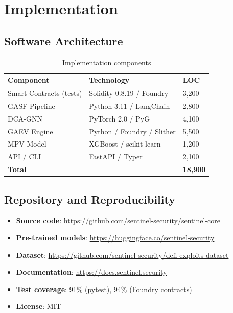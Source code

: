 \documentclass[11pt]{article}
\theoremstyle{definition}
\theoremstyle{plain}
\theoremstyle{remark}
\begin{document}
\section{Implementation}
\label{sec:implementation}

\subsection{Software Architecture}

\begin{table}[H]
\centering
\caption{Implementation components}
\label{tab:implementation}
\begin{tabular}{lll}
\toprule
\textbf{Component} & \textbf{Technology} & \textbf{LOC} \\
\midrule
Smart Contracts (tests) & Solidity 0.8.19 / Foundry & 3,200 \\
GASF Pipeline & Python 3.11 / LangChain & 2,800 \\
DCA-GNN & PyTorch 2.0 / PyG~\cite{fey2019fast} & 4,100 \\
GAEV Engine & Python / Foundry / Slither & 5,500 \\
MPV Model & XGBoost / scikit-learn & 1,200 \\
API / CLI & FastAPI / Typer & 2,100 \\
\midrule
\textbf{Total} & & \textbf{18,900} \\
\bottomrule
\end{tabular}
\end{table}

\subsection{Repository and Reproducibility}

\begin{itemize}
    \item \textbf{Source code}: \url{https://github.com/sentinel-security/sentinel-core}
    \item \textbf{Pre-trained models}: \url{https://huggingface.co/sentinel-security}
    \item \textbf{Dataset}: \url{https://github.com/sentinel-security/defi-exploits-dataset}
    \item \textbf{Documentation}: \url{https://docs.sentinel.security}
    \item \textbf{Test coverage}: 91\% (pytest), 94\% (Foundry contracts)
    \item \textbf{License}: MIT
\end{itemize}
\end{document}

